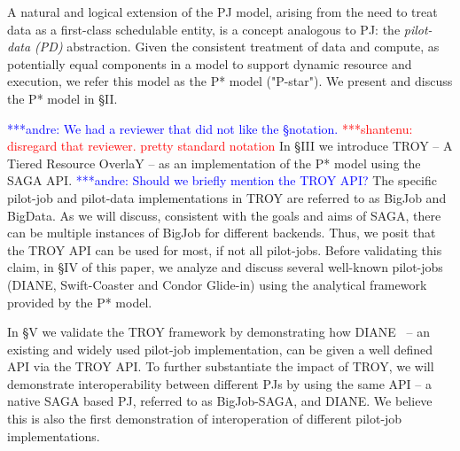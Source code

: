 \documentclass[conference,final]{IEEEtran}
\newcommand{\jhanote}[1]{ {\textcolor{red} { ***shantenu: #1 }}}
\newcommand{\alnote}[1]{ {\textcolor{blue} { ***andre: #1 }}}
\newcommand{\alnote}[1]{}
\newcommand{\jhanote}[1]{}
\begin{document}
A natural and logical extension of the PJ model, arising from the need
to treat data as a first-class schedulable entity, is a concept
analogous to PJ: the \emph{pilot-data (PD)} abstraction. Given the
consistent treatment of data and compute, as potentially equal
components in a model to support dynamic resource and execution,
we refer this model as the P* model ("P-star"). We present and discuss
the P* model in \S{II}.

\alnote{We had a reviewer that did not like the \S notation.}
\jhanote{disregard that reviewer. pretty standard notation} In \S{III}
we introduce TROY -- A Tiered Resource OverlaY -- as an implementation
of the P* model using the SAGA API. \alnote{Should we briefly mention
  the TROY API?} The specific pilot-job and pilot-data implementations
in TROY are referred to as BigJob and BigData. As we will discuss,
consistent with the goals and aims of SAGA, there can be
multiple %
instances of BigJob for different backends.  Thus, we posit that the
TROY API %
can be used for most, if not all pilot-jobs. Before validating this
claim, in \S{IV} of this paper, we analyze and discuss several
well-known pilot-jobs (DIANE, Swift-Coaster and Condor Glide-in) using
the analytical framework provided by the P* model.


In \S{V} we validate the TROY framework by demonstrating how
DIANE~\cite{Moscicki:908910} -- an existing and widely used pilot-job
implementation, can be given a well defined API via the TROY API. To
further substantiate the impact of TROY, we will demonstrate
interoperability between different PJs by using the same API -- a
native SAGA based PJ, referred to as BigJob-SAGA, and DIANE. We
believe this is also the first demonstration of interoperation of
different pilot-job implementations.




\end{document}
